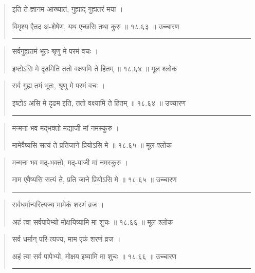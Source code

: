 \begin{quotation}

इति ते ज्ञानम आख्यातं, गुह्याद्‍ गुह्यतरं मया  ।  

विमृश्य एैतद अ-शेषेण, यथ एच्छसि तथा कुरु  ॥ १८.६३ ॥  उच्चारण

\noindent\rule{16cm}{0.4pt} 
\end{quotation}


\begin{quotation}

सर्वगुह्यतमं भूतः श्रृणु मे परमं वचः  ।  

इष्टोऽसि मे दृढमिति ततो वक्ष्यामि ते हितम्‌  ॥ १८.६४ ॥  मूल श्लोक
\end{quotation}

\begin{quotation}

सर्व गुह्य तमं भूतः, श्रृणु मे परमं वचः  ।  

इष्टोऽ असि मे दृढम इति, ततो वक्ष्यामि ते हितम्‌  ॥ १८.६४ ॥  उच्चारण

\noindent\rule{16cm}{0.4pt} 
\end{quotation}


\begin{quotation}

मन्मना भव मद्भक्तो मद्याजी मां नमस्कुरु  ।  

मामेवैष्यसि सत्यं ते प्रतिजाने प्रियोऽसि मे  ॥ १८.६५ ॥  मूल श्लोक
\end{quotation}

\begin{quotation}
मन्मना भव मद्-भक्तो, मद्-याजी मां नमस्कुरु  ।  

माम एवैष्यसि सत्यं ते, प्रति जाने प्रियोऽसि मे  ॥ १८.६५ ॥  उच्चारण

\noindent\rule{16cm}{0.4pt} 
\end{quotation}


\begin{quotation}

सर्वधर्मान्परित्यज्य मामेकं शरणं व्रज  ।  

अहं त्वा सर्वपापेभ्यो मोक्षयिष्यामि मा शुचः  ॥ १८.६६ ॥  मूल श्लोक
\end{quotation}

\begin{quotation}

सर्व धर्मान् परि-त्यज्य, माम एकं शरणं व्रज  ।  

अहं त्वा सर्व पापेभ्यो, मोक्षय इष्यामि मा शुचः  ॥ १८.६६ ॥  उच्चारण

\noindent\rule{16cm}{0.4pt} 
\end{quotation}


